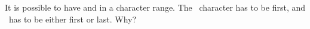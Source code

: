 It is possible to have \n{]} and \n{-} in a character range. The
  \n{]}~character has to be first, and \n{-}~has to be either first or
    last. Why?
